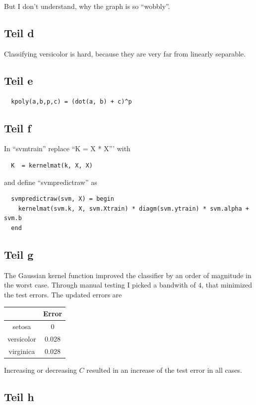 \documentclass[10pt,a4paper]{article}
\begin{document}
But I don't understand, why the graph is so ``wobbly''.

\subsection{Teil d}

Classifying versicolor is hard, because they are very far from linearly
separable.

\subsection{Teil e}

\begin{lstlisting}
  kpoly(a,b,p,c) = (dot(a, b) + c)^p
\end{lstlisting}

\subsection{Teil f}

In ``svmtrain'' replace ``K = X * X''' with
\begin{lstlisting}
  K  = kernelmat(k, X, X)
\end{lstlisting}
and define ``svmpredictraw'' as
\begin{lstlisting}
  svmpredictraw(svm, X) = begin
    kernelmat(svm.k, X, svm.Xtrain) * diagm(svm.ytrain) * svm.alpha + svm.b
  end
\end{lstlisting}

\subsection{Teil g}

The Gaussian kernel function improved the classifier by an order of magnitude in
the worst case. Through manual testing I picked a bandwith of $4$, that
minimized the test errors. The updated errors are
\begin{tabular}{c|c}
  & Error\\\hline
  setosa & 0 \\\hline
  versicolor & 0.028 \\\hline
  virginica & 0.028
\end{tabular}
Increasing or decreasing $C$ resulted in an increase of the test error in all
cases.

\subsection{Teil h}
\end{document}
